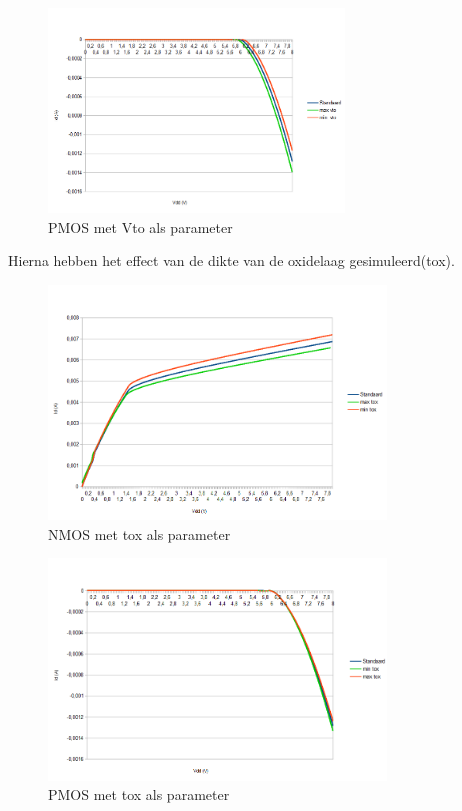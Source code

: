 \documentclass{article}
\begin{document}
\begin{figure}[H]
	\centering
	\includegraphics[width=0.7\textwidth]{pmosvto}
	\caption{PMOS met Vto als parameter}
\end{figure}
\clearpage

Hierna hebben het effect van de dikte van de oxidelaag gesimuleerd(tox).

\begin{figure}[H]
	\centering
	\includegraphics[width=0.8\textwidth]{nmostox}
	\caption{NMOS met tox als parameter}
\end{figure}

\begin{figure}[H]
	\centering
	\includegraphics[width=0.8\textwidth]{pmostox}
	\caption{PMOS met tox als parameter}
\end{figure}
\end{document}
